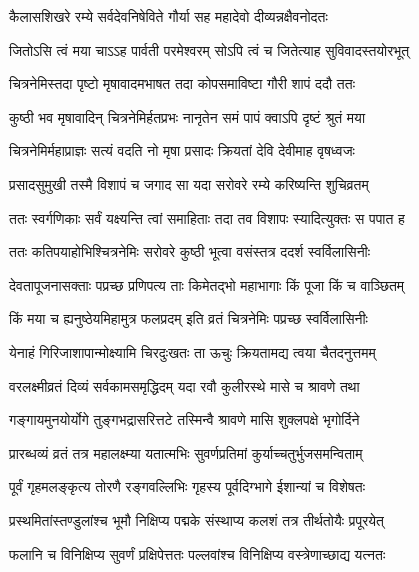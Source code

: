 
\begin{center}


\twolineshloka
{कैलासशिखरे रम्ये सर्वदेवनिषेविते}
{गौर्या सह महादेवो दीव्यन्नक्षैवनोदतः}%


\twolineshloka
{जितोऽसि त्वं मया चाऽऽह पार्वती परमेश्वरम्}
{सोऽपि त्वं च जितेत्याह सुविवादस्तयोरभूत्}%


\twolineshloka
{चित्रनेमिस्तदा पृष्टो मृषावादमभाषत}
{तदा कोपसमाविष्टा गौरी शापं ददौ ततः}%


\twolineshloka
{कुष्ठी भव मृषावादिन् चित्रनेमिर्हतप्रभः}
{नानृतेन समं पापं क्वाऽपि दृष्टं श्रुतं मया}%


\twolineshloka
{चित्रनेमिर्महाप्राज्ञः सत्यं वदति नो मृषा}
{प्रसादः क्रियतां देवि देवीमाह वृषध्वजः}%


\twolineshloka
{प्रसादसुमुखी तस्मै विशापं च जगाद सा}
{यदा सरोवरे रम्ये करिष्यन्ति शुचिव्रतम्}%


\twolineshloka
{ततः स्वर्गणिकाः सर्वं यक्ष्यन्ति त्वां समाहिताः}
{तदा तव विशापः स्यादित्युक्तः स पपात ह}%


\twolineshloka
{ततः कतिपयाहोभिश्चित्रनेमिः सरोवरे}
{कुष्ठी भूत्वा वसंस्तत्र ददर्श स्वर्विलासिनीः}%


\twolineshloka
{देवतापूजनासक्ताः पप्रच्छ प्रणिपत्य ताः}
{किमेतद्भो महाभागाः किं पूजा किं च वाञ्छितम्}%


\twolineshloka
{किं मया च ह्यनुष्ठेयमिहामुत्र फलप्रदम्}
{इति व्रतं चित्रनेमिः पप्रच्छ स्वर्विलासिनीः}%


\twolineshloka
{येनाहं गिरिजाशापान्मोक्ष्यामि चिरदुःखतः}
{ता ऊचुः क्रियतामद्य त्वया चैतदनुत्तमम्}%


\twolineshloka
{वरलक्ष्मीव्रतं दिव्यं सर्वकामसमृद्धिदम्}
{यदा रवौ कुलीरस्थे मासे च श्रावणे तथा}%


\twolineshloka
{गङ्गायमुनयोर्योगे तुङ्गभद्रासरित्तटे}
{तस्मिन्वै श्रावणे मासि शुक्लपक्षे भृगोर्दिने}%


\twolineshloka
{प्रारब्धव्यं व्रतं तत्र महालक्ष्म्या यतात्मभिः}
{सुवर्णप्रतिमां कुर्याच्चतुर्भुजसमन्विताम्}%


\twolineshloka
{पूर्वं गृहमलङ्कृत्य तोरणै रङ्गवल्लिभिः}
{गृहस्य पूर्वदिग्भागे ईशान्यां च विशेषतः}%


\twolineshloka
{प्रस्थमितांस्तण्डुलांश्च भूमौ निक्षिप्य पद्मके}
{संस्थाप्य कलशं तत्र तीर्थतोयैः प्रपूरयेत्}%


\twolineshloka
{फलानि च विनिक्षिप्य सुवर्णं प्रक्षिपेत्ततः}
{पल्लवांश्च विनिक्षिप्य वस्त्रेणाच्छाद्य यत्नतः}%



\end{center}
